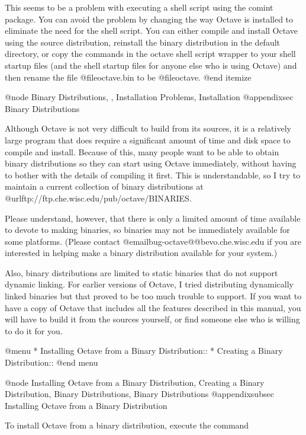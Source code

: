 This seems to be a problem with executing a shell script using the
comint package.  You can avoid the problem by changing the way Octave is
installed to eliminate the need for the shell script.  You can either
compile and install Octave using the source distribution, reinstall the
binary distribution in the default directory, or copy the commands in
the octave shell script wrapper to your shell startup files (and the
shell startup files for anyone else who is using Octave) and then
rename the file @file{octave.bin} to be @file{octave}.
@end itemize

@node Binary Distributions,  , Installation Problems, Installation
@appendixsec Binary Distributions

Although Octave is not very difficult to build from its sources, it is a
relatively large program that does require a significant amount of time
and disk space to compile and install.  Because of this, many people
want to be able to obtain binary distributions so they can start using
Octave immediately, without having to bother with the details of
compiling it first.  This is understandable, so I try to maintain a
current collection of binary distributions at
@url{ftp://ftp.che.wisc.edu/pub/octave/BINARIES}.

Please understand, however, that there is only a limited amount of time
available to devote to making binaries, so binaries may not be
immediately available for some platforms.  (Please contact
@email{bug-octave@@bevo.che.wisc.edu} if you are interested in helping
make a binary distribution available for your system.)

Also, binary distributions are limited to static binaries that do not
support dynamic linking.  For earlier versions of Octave, I tried
distributing dynamically linked binaries but that proved to be too much
trouble to support.  If you want to have a copy of Octave that includes
all the features described in this manual, you will have to build it
from the sources yourself, or find someone else who is willing to do it
for you.

@menu
* Installing Octave from a Binary Distribution::  
* Creating a Binary Distribution::  
@end menu

@node Installing Octave from a Binary Distribution, Creating a Binary Distribution, Binary Distributions, Binary Distributions
@appendixsubsec Installing Octave from a Binary Distribution

To install Octave from a binary distribution, execute the command

